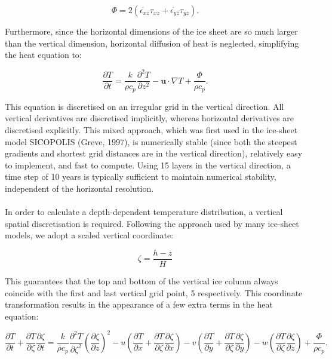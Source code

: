 \documentclass{article}
\begin{document}
\begin{equation}
\Phi = 2 \left( \dot{\epsilon_{xz}} \tau_{xz} + \dot{\epsilon_{yz}} \tau_{yz} \right).
\end{equation}

Furthermore, since the horizontal dimensions of the ice sheet are so much larger than the vertical dimension, horizontal diffusion of heat is neglected, simplifying the heat equation to:

\begin{equation}
\frac{\partial T}{\partial t} = \frac{k}{\rho c_p} \frac{\partial^2 T}{\partial z^2} - \mathbf{u} \cdot \nabla T + \frac{\Phi}{\rho c_p}.
\end{equation}

This equation is discretised on an irregular grid in the vertical direction. All vertical derivatives are discretised implicitly, whereas horizontal derivatives are discretised explicitly. This mixed approach, which was first used in the ice-sheet model SICOPOLIS (Greve, 1997), is numerically stable (since both the steepest gradients and shortest grid distances are in the vertical direction), relatively easy to implement, and fast to compute. Using 15 layers in the vertical direction, a time step of 10 years is typically sufficient to maintain numerical stability, independent of the horizontal resolution.\\
\\
In order to calculate a depth-dependent temperature distribution, a vertical spatial discretisation is required. Following the approach used by many ice-sheet models, we adopt a scaled vertical coordinate:

\begin{equation} \label{eq:zeta}
\zeta = \frac{h-z}{H}
\end{equation}

This guarantees that the top and bottom of the vertical ice column always coincide with the first and last vertical grid point, 5 respectively. This coordinate transformation results in the appearance of a few extra terms in the heat equation:

\begin{equation}
\frac{\partial T}{\partial t} + \frac{\partial T}{\partial \zeta} \frac{\partial \zeta}{\partial t} =
\frac{k}{\rho c_p} \frac{\partial^2 T}{\partial \zeta^2} {\left( \frac{\partial \zeta}{\partial z} \right) }^2
- u \left( \frac{\partial T}{\partial x} + \frac{\partial T}{\partial \zeta} \frac{\partial \zeta}{\partial x} \right)
- v \left( \frac{\partial T}{\partial y} + \frac{\partial T}{\partial \zeta} \frac{\partial \zeta}{\partial y} \right)
- w \left( \frac{\partial T}{\partial \zeta} \frac{\partial \zeta}{\partial z} \right)
+ \frac{\Phi}{\rho c_p}.
\end{equation}
\end{document}
